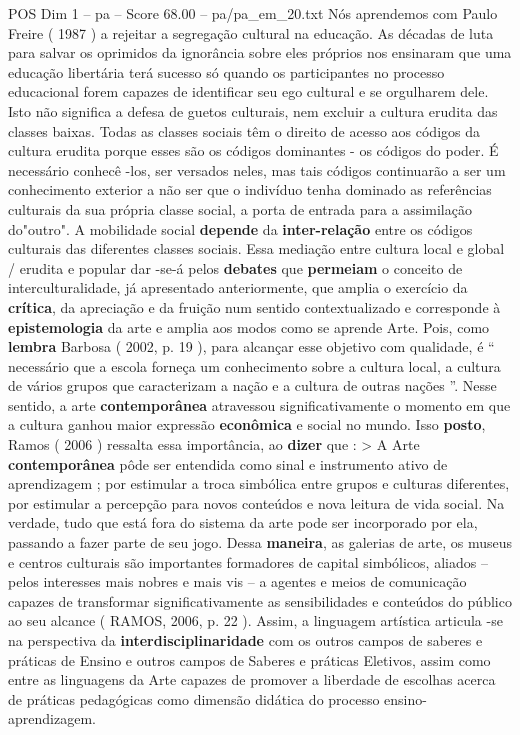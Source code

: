 \begin{textsample}{POS Dim 1 – pa – Score 68.00 – pa/pa\_em\_20.txt}
Nós aprendemos com Paulo Freire ( 1987 ) a rejeitar a segregação cultural na educação.
As décadas de luta para salvar os oprimidos da ignorância sobre eles próprios nos ensinaram que uma educação libertária terá sucesso só quando os participantes no processo educacional forem capazes de identificar seu ego cultural e se orgulharem dele.
Isto não significa a defesa de guetos culturais, nem excluir a cultura erudita das classes baixas.
Todas as classes sociais têm o direito de acesso aos códigos da cultura erudita porque esses são os códigos dominantes - os códigos do poder.
É necessário conhecê -los, ser versados neles, mas tais códigos continuarão a ser um conhecimento exterior a não ser que o indivíduo tenha dominado as referências culturais da sua própria classe social, a porta de entrada para a assimilação do"outro".
A mobilidade social \textbf{depende} da \textbf{inter-relação} entre os códigos culturais das diferentes classes sociais.
Essa mediação entre cultura local e global / erudita e popular dar -se-á pelos \textbf{debates} que \textbf{permeiam} o conceito de interculturalidade, já apresentado anteriormente, que amplia o exercício da \textbf{crítica}, da apreciação e da fruição num sentido contextualizado e corresponde à \textbf{epistemologia} da arte e amplia aos modos como se aprende Arte.
Pois, como \textbf{lembra} Barbosa ( 2002, p. 19 ), para alcançar esse objetivo com qualidade, é “ necessário que a escola forneça um conhecimento sobre a cultura local, a cultura de vários grupos que caracterizam a nação e a cultura de outras nações ”.
Nesse sentido, a arte \textbf{contemporânea} atravessou significativamente o momento em que a cultura ganhou maior expressão \textbf{econômica} e social no mundo.
Isso \textbf{posto}, Ramos ( 2006 ) ressalta essa importância, ao \textbf{dizer} que : > A Arte \textbf{contemporânea} pôde ser entendida como sinal e instrumento ativo de aprendizagem ; por estimular a troca simbólica entre grupos e culturas diferentes, por estimular a percepção para novos conteúdos e nova leitura de vida social.
Na verdade, tudo que está fora do sistema da arte pode ser incorporado por ela, passando a fazer parte de seu jogo.
Dessa \textbf{maneira}, as galerias de arte, os museus e centros culturais são importantes formadores de capital simbólicos, aliados – pelos interesses mais nobres e mais vis – a agentes e meios de comunicação capazes de transformar significativamente as sensibilidades e conteúdos do público ao seu alcance ( RAMOS, 2006, p. 22 ).
Assim, a linguagem artística articula -se na perspectiva da \textbf{interdisciplinaridade} com os outros campos de saberes e práticas de Ensino e outros campos de Saberes e práticas Eletivos, assim como entre as linguagens da Arte capazes de promover a liberdade de escolhas acerca de práticas pedagógicas como dimensão didática do processo ensino-aprendizagem.

\end{textsample}
